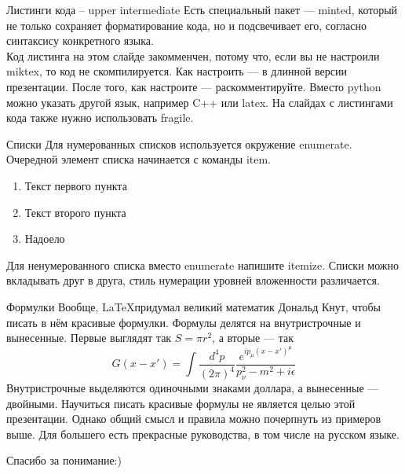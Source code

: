\documentclass{beamer}      %
\begin{document}
\begin{frame}[fragile]{Листинги кода -- upper intermediate}
Есть специальный пакет --- minted, который не только сохраняет форматирование кода, но и подсвечивает его, согласно синтаксису конкретного языка. \medskip \\ %
Код листинга на этом слайде закомменчен, потому что, если вы не настроили miktex, то код не скомпилируется. Как настроить --- в длинной версии презентации. После того, как настроите --- раскомментируйте.
Вместо python можно указать другой язык, например C++ или latex. На слайдах с листингами кода также нужно использовать fragile.
\end{frame}

\begin{frame}[fragile]{Списки}
Для нумерованных списков используется окружение enumerate. Очередной элемент списка начинается с команды item. \medskip
\begin{enumerate}
\item Текст первого пункта
\item Текст второго пункта
\item Надоело
\end{enumerate}
Для ненумерованного списка вместо enumerate напишите itemize. Списки можно вкладывать друг в друга, стиль нумерации уровней вложенности различается.
\end{frame}

\begin{frame}[fragile]{Формулки}
Вообще, \LaTeX придумал великий математик Дональд Кнут, чтобы писать в нём красивые формулки. Формулы делятся на внутристрочные и вынесенные. Первые выглядят так $S=\pi r^2$, а вторые --- так
$$
G(x-x') = \int \frac{d^4 p}{(2 \pi)^4} \frac{e^{i p_\mu (x - x')^\mu}}{p_\nu^2 - m^2 + i \epsilon}
$$
Внутристрочные  выделяются одиночными знаками доллара, а вынесенные --- двойными.
Научиться писать красивые формулы не является целью этой презентации. Однако общий смысл и правила можно почерпнуть из примеров выше. Для большего есть прекрасные руководства, в том числе на русском языке.
\end{frame}

\begin{frame}
\Huge \centering Спасибо за понимание:)
\end{frame}
\end{document}
